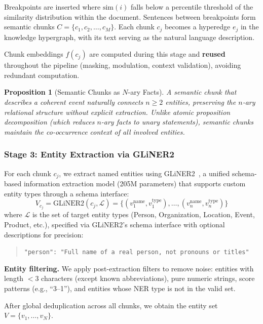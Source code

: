 \documentclass[11pt,a4paper]{article}
\newtheorem{proposition}{Proposition}
\begin{document}
Breakpoints are inserted where $\text{sim}(i)$ falls below a percentile threshold of the similarity distribution within the document. Sentences between breakpoints form semantic chunks $C = \{c_1, c_2, \ldots, c_M\}$. Each chunk $c_j$ becomes a hyperedge $e_j$ in the knowledge hypergraph, with its text serving as the natural language description.

Chunk embeddings $f(c_j)$ are computed during this stage and \textbf{reused} throughout the pipeline (masking, modulation, context validation), avoiding redundant computation.

\begin{proposition}[Semantic Chunks as $N$-ary Facts]
A semantic chunk that describes a coherent event naturally connects $n \geq 2$ entities, preserving the $n$-ary relational structure without explicit extraction. Unlike atomic proposition decomposition (which reduces $n$-ary facts to unary statements), semantic chunks maintain the co-occurrence context of all involved entities.
\end{proposition}

\subsubsection{Stage 3: Entity Extraction via GLiNER2}

For each chunk $c_j$, we extract named entities using GLiNER2~\cite{zaratiana2025gliner2}, a unified schema-based information extraction model (205M parameters) that supports custom entity types through a schema interface:
\begin{equation}
    V_{c_j} = \text{GLiNER2}(c_j, \mathcal{L}) = \{(v_1^{\text{name}}, v_1^{\text{type}}), \ldots, (v_n^{\text{name}}, v_n^{\text{type}})\}
\end{equation}
where $\mathcal{L}$ is the set of target entity types (Person, Organization, Location, Event, Product, etc.), specified via GLiNER2's schema interface with optional descriptions for precision:
\begin{quote}
    \texttt{"person": "Full name of a real person, not pronouns or titles"}
\end{quote}

\textbf{Entity filtering.} We apply post-extraction filters to remove noise: entities with length $< 3$ characters (except known abbreviations), pure numeric strings, score patterns (e.g., ``3--1''), and entities whose NER type is not in the valid set.

After global deduplication across all chunks, we obtain the entity set $V = \{v_1, \ldots, v_N\}$.
\end{document}
